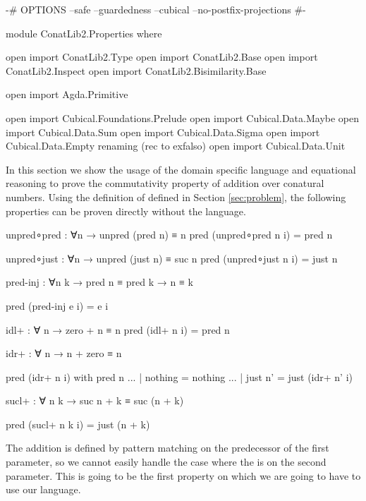 \begin{code}[hide]
{-# OPTIONS --safe --guardedness --cubical --no-postfix-projections #-}

module ConatLib2.Properties where

open import ConatLib2.Type
open import ConatLib2.Base
open import ConatLib2.Inspect
open import ConatLib2.Bisimilarity.Base

open import Agda.Primitive

open import Cubical.Foundations.Prelude
open import Cubical.Data.Maybe
open import Cubical.Data.Sum
open import Cubical.Data.Sigma
open import Cubical.Data.Empty
  renaming (rec to exfalso)
open import Cubical.Data.Unit
\end{code}

In this section we show the usage of the domain specific language and
equational reasoning to prove the commutativity property of addition
over conatural numbers. Using the definition of \AgdaFunction{\_+\_}
defined in Section \ref{sec:problem}, the following properties can be proven
directly without the language.

\begin{code}[hide]
unpred∘pred : ∀{n} → unpred (pred n) ≡ n
pred (unpred∘pred {n} i) = pred n

unpred∘just : ∀{n} → unpred (just n) ≡ suc n
pred (unpred∘just {n} i) = just n
\end{code}
\begin{code}
pred-inj : ∀{n k} → pred n ≡ pred k → n ≡ k
\end{code}
\begin{code}[hide]
pred (pred-inj e i) = e i
\end{code}
\begin{code}[hide]
idl+ : ∀ n → zero + n ≡ n
pred (idl+ n i) = pred n
\end{code}
\begin{code}
idr+ : ∀ n → n + zero ≡ n
\end{code}
\begin{code}[hide]
pred (idr+ n i) with pred n
... | nothing = nothing
... | just n' = just (idr+ n' i)
\end{code}
\begin{code}
sucl+ : ∀ n k → suc n + k ≡ suc (n + k)
\end{code}
\begin{code}[hide]
pred (sucl+ n k i) = just (n + k)
\end{code}

The addition is defined by pattern matching on the predecessor of the
first parameter, so we cannot easily handle the case where the 
is on the second parameter. This is going to be the first property on which
we are going to have to use our language.

